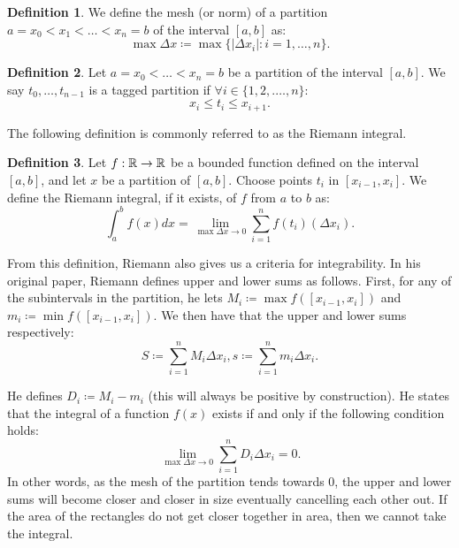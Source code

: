 \documentclass{article}
\theoremstyle{axiom} \newtheorem{axiom}{Axiom}
\theoremstyle{definition} \newtheorem{definition}{Definition}
\theoremstyle{example} \newtheorem{example}{Example}
\theoremstyle{proposition} \newtheorem{prop}{Proposition}
\theoremstyle{lemma} \newtheorem{lemma}{Lemma}
\begin{document}
\begin{definition}
	We define the mesh (or norm) of a partition $a = x_0 < x_1 <\ldots<x_n = b$ 
	of the interval $[a,b]$  as:
	\begin{equation}
		\max \Delta x \coloneqq \max\{|\Delta x_i|: i=1,\ldots,n \}.
	\end{equation}
\end{definition}

\begin{definition}
	Let $a = x_0 < \ldots < x_n = b$ be a partition of the interval $[a,b]$. We
	say $t_0,\ldots, t_{n-1}$ is a tagged partition if $\forall i \in \{1,2,.\ldots,n\}$:
	\begin{equation}
		x_i \leq t_i \leq x_{i+1}.
	\end{equation}
\end{definition}

The following definition is commonly referred to as the Riemann integral.

\begin{definition}
	Let $f:\mathbb{R}\rightarrow \mathbb{R}$ be a bounded function defined on the interval $[a,b]$, and
	let $x$ be a partition of $[a,b]$. Choose points $t_i$ in $[x_{i-1}, x_i]$.
	We define the Riemann integral, if it exists, of $f$ from $a$ to $b$ as:
	\begin{equation}
		\int^b_a f(x)dx = \lim_{\max \Delta x \rightarrow 0} 
		\sum^{n}_{i=1} f(t_i)(\Delta x_i ).
	\end{equation}
\end{definition}

From this definition, Riemann also gives us a criteria for integrability. 
In his original paper, Riemann defines upper and lower sums as follows. First, 
for any of the subintervals in the partition, he lets $M_i \coloneqq \max f([x_{i-1},x_i])$ and 
$m_i \coloneqq \min f([x_{i-1},x_i])$. We then have that the upper and lower
sums respectively:
\begin{equation*}
	S \coloneqq \sum^{n}_{i=1} M_i \Delta x_i, 
	 s \coloneqq \sum^{n}_{i=1} m_i \Delta x_i.
\end{equation*}

He defines $D_i \coloneqq M_i - m_i$ (this will always be positive by 
construction). He states that the integral of a function $f(x)$ exists if and 
only if the following condition holds:
\begin{equation*}
	\lim_{\max \Delta x \rightarrow 0} \sum^{n}_{i=1} D_i\Delta x_i = 0.
\end{equation*}
In other words, as the mesh of the partition tends towards $0$, the upper and 
lower sums will become closer and closer in size eventually cancelling each other
out. If the area of the rectangles do not get closer together in area, then 
we cannot take the integral.
\end{document}
